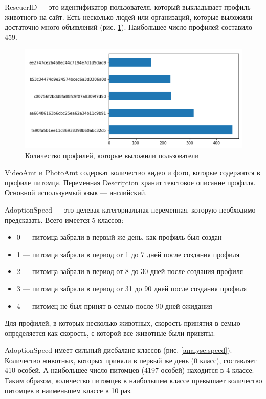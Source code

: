\documentclass[14pt]{mmcs_article}
\begin{document}
RescuerID --- это идентификатор пользователя, который выкладывает профиль животного на сайт. Есть несколько людей или организаций, которые выложили достаточно много объявлений (рис. \ref{analyse:rescuer}). Наибольшее число профилей составило 459.

\begin{figure}[H]
	\centering
	\includegraphics[scale=0.8]{rescuer.png}
	\caption{Количество профилей, которые выложили пользователи}\label{analyse:rescuer}
\end{figure}

VideoAmt и PhotoAmt содержат количество видео и фото, которые содержатся в профиле питомца.
Переменная Description хранит текстовое описание профиля. Основной используемый язык --- английский.

AdoptionSpeed --- это целевая категориальная переменная, которую необходимо предсказать. Всего имеется 5 классов:

\begin{itemize}
	\item 0 --- питомца забрали в первый же день, как профиль был создан
	\item 1 --- питомца забрали в период от 1 до 7 дней после создания профиля
	\item 2 --- питомца забрали в период от 8 до 30 дней после создания профиля
	\item 3 --- питомца забрали в период от 31 до 90 дней после создания профиля
	\item 4 --- питомец не был принят в семью после 90 дней ожидания
\end{itemize}

Для профилей, в которых несколько животных, скорость принятия в семью определяется как скорость, с которой все животные были приняты. 

AdoptionSpeed имеет сильный дисбаланс классов (рис. \ref{analyse:speed}). Количество животных, которых приняли в первый же день (0 класс), составляет 410 особей. А наибольшее число питомцев (4197 особей) находится в 4 классе. Таким образом, количество питомцев в наибольшем классе превышает количество питомцев в наименьшем классе в 10 раз.
\end{document}
